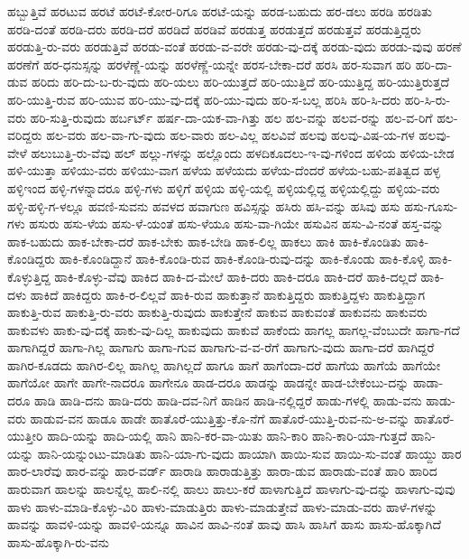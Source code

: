 {ಹಬ್ಬುತ್ತಿವೆ
ಹರಟುವ
ಹರಟೆ
ಹರಟೆ-ಕೋರ-ರಿಗೂ
ಹರಟೆ-ಯನ್ನು
ಹರಡ-ಬಹುದು
ಹರ-ಡಲು
ಹರಡಿ
ಹರಡಿತು
ಹರಡಿ-ದಂತೆ
ಹರಡಿ-ದರು
ಹರಡಿ-ದರೆ
ಹರಡಿದೆ
ಹರಡಿವೆ
ಹರಡುತ್ತ
ಹರಡುತ್ತದೆ
ಹರಡುತ್ತವೆ
ಹರಡುತ್ತಿದ್ದರು
ಹರಡುತ್ತಿ-ರು-ವರು
ಹರಡುತ್ತಿವೆ
ಹರಡು-ವಂತೆ
ಹರಡು-ವ-ವರೇ
ಹರಡು-ವು-ದಕ್ಕೆ
ಹರಡು-ವುದು
ಹರಡು-ವುವು
ಹರಣೆ
ಹರಣೆಗೆ
ಹರ-ಧನುಸ್ಸನ್ನು
ಹರಳೆಣ್ಣೆ-ಯನ್ನು
ಹರಳೆಣ್ಣೆ-ಯನ್ನೇ
ಹರಸ-ಬೇಕಾ-ದರೆ
ಹರಸಿ
ಹರ-ಸುವಾಗ
ಹರಿ
ಹರಿ-ದಾ-ಡುವ
ಹರಿದು
ಹರಿ-ದು-ಬ-ರು-ವುದು
ಹರಿ-ಯಲು
ಹರಿ-ಯುತ್ತದೆ
ಹರಿ-ಯುತ್ತಿದೆ
ಹರಿ-ಯುತ್ತಿದ್ದ
ಹರಿ-ಯುತ್ತಿರುತ್ತದೆ
ಹರಿ-ಯುತ್ತಿ-ರುವ
ಹರಿ-ಯುವ
ಹರಿ-ಯು-ವು-ದಕ್ಕೆ
ಹರಿ-ಯು-ವುದು
ಹರಿ-ಸ-ಬಲ್ಲ
ಹರಿಸಿ
ಹರಿ-ಸಿ-ದರು
ಹರಿ-ಸಿ-ರು-ವರು
ಹರಿ-ಸುತ್ತಿ-ರುವುದು
ಹರ್ಬರ್ಟ್
ಹರ್ಷ-ದಾ-ಯಕ-ವಾ-ಗಿತ್ತು
ಹಲ
ಹಲ-ವನ್ನು
ಹಲವ-ರನ್ನು
ಹಲ-ವ-ರಿಗೆ
ಹಲ-ವರಿದ್ದರು
ಹಲ-ವರು
ಹಲ-ವಾ-ಗು-ವುದು
ಹಲ-ವಾರು
ಹಲ-ವಿಲ್ಲ
ಹಲವಿವೆ
ಹಲವು
ಹಲವು-ವಿಷ-ಯ-ಗಳ
ಹಲವು-ವೇಳೆ
ಹಲುಬುತ್ತಿ-ರು-ವೆವು
ಹಲ್
ಹಲ್ಲು-ಗಳನ್ನು
ಹಲ್ಲೊಂದು
ಹಳದಿಕೂದಲು-ಇ-ವು-ಗಳಿಂದ
ಹಳಿಯ
ಹಳಿಯ-ಬೇಡ
ಹಳಿ-ಯುತ್ತಾ
ಹಳಿಯು-ವರು
ಹಳಿಯು-ವಾಗ
ಹಳೆಯ
ಹಳೆಯದು
ಹಳೆಯ-ದೆಂದರೆ
ಹಳೆಯ-ಬಹು-ಪತಿತ್ವದ
ಹಳ್ಳ
ಹಳ್ಳಿಇಂದ
ಹಳ್ಳಿ-ಗಳನ್ನಾದರೂ
ಹಳ್ಳಿ-ಗಳು
ಹಳ್ಳಿಗೆ
ಹಳ್ಳಿಯ
ಹಳ್ಳಿ-ಯಲ್ಲಿ
ಹಳ್ಳಿಯಲ್ಲಿದ್ದ
ಹಳ್ಳಿಯಲ್ಲಿದ್ದು
ಹಳ್ಳಿಯ-ವರು
ಹಳ್ಳಿ-ಹಳ್ಳಿ-ಗ-ಳಲ್ಲೂ
ಹವಣಿ-ಸುವನು
ಹವಳದ
ಹವಾಗುಣ
ಹವಿಸ್ಸನ್ನು
ಹಸಿರು
ಹಸಿ-ವನ್ನು
ಹಸಿವು
ಹಸು
ಹಸು-ಗೂಸು-ಗಳು
ಹಸುರು
ಹಸು-ಳೆಯ
ಹಸು-ಳೆ-ಯಂತೆ
ಹಸು-ಳೆಯೂ
ಹಸು-ವಾ-ಗಿಯೇ
ಹಸುವಿನ
ಹಸು-ವಿ-ನಂತೆ
ಹಸ್ತ-ವನ್ನು
ಹಾಕ-ಬಹುದು
ಹಾಕ-ಬೇಕಾ-ದರೆ
ಹಾಕ-ಬೇಕು
ಹಾಕ-ಬೇಡಿ
ಹಾಕ-ಲಿಲ್ಲ
ಹಾಕಲು
ಹಾಕಿ
ಹಾಕಿ-ಕೊಂಡಿತು
ಹಾಕಿ-ಕೊಂಡಿದ್ದರು
ಹಾಕಿ-ಕೊಂಡಿದ್ದಾನೆ
ಹಾಕಿ-ಕೊಂಡಿ-ರುವ
ಹಾಕಿ-ಕೊಂಡಿ-ರುವು-ದನ್ನು
ಹಾಕಿ-ಕೊಂಡು
ಹಾಕಿ-ಕೊಳ್ಳಿ
ಹಾಕಿ-ಕೊಳ್ಳುತ್ತಿದ್ದ
ಹಾಕಿ-ಕೊಳ್ಳು-ವೆವು
ಹಾಕಿದ
ಹಾಕಿ-ದ-ಮೇಲೆ
ಹಾಕಿ-ದರು
ಹಾಕಿ-ದರೂ
ಹಾಕಿ-ದರೆ
ಹಾಕಿ-ದಲ್ಲದೆ
ಹಾಕಿ-ದಳು
ಹಾಕಿದೆ
ಹಾಕಿದ್ದರು
ಹಾಕಿ-ರ-ಲಿಲ್ಲವೆ
ಹಾಕಿ-ರುವ
ಹಾಕುತ್ತಾನೆ
ಹಾಕುತ್ತಿದ್ದರು
ಹಾಕುತ್ತಿದ್ದಳು
ಹಾಕುತ್ತಿದ್ದಾಗ
ಹಾಕುತ್ತಿ-ರುವ
ಹಾಕುತ್ತಿ-ರು-ವರು
ಹಾಕುತ್ತಿ-ರುವುದು
ಹಾಕುತ್ತೇನೆ
ಹಾಕುವ
ಹಾಕುವಂತೆ
ಹಾಕುವನು
ಹಾಕುವರು
ಹಾಕುವಳು
ಹಾಕು-ವು-ದಕ್ಕೆ
ಹಾಕು-ವು-ದಿಲ್ಲ
ಹಾಕುವುದು
ಹಾಕುವೆ
ಹಾಕೆಂದು
ಹಾಗಲ್ಲ
ಹಾಗಲ್ಲ-ವೆಂಬುದೇ
ಹಾಗಾ-ಗದೆ
ಹಾಗಾಗಿದ್ದರೆ
ಹಾಗಾ-ಗಿಲ್ಲ
ಹಾಗಾಗು
ಹಾಗಾ-ಗುವ
ಹಾಗಾಗು-ವ-ವ-ರೆಗೆ
ಹಾಗಾಗು-ವುದು
ಹಾಗಾ-ದರೆ
ಹಾಗಿದ್ದರೆ
ಹಾಗಿರ-ಕೂಡದು
ಹಾಗಿರ-ಲಿಲ್ಲ
ಹಾಗಿಲ್ಲ
ಹಾಗಿಲ್ಲದೆ
ಹಾಗೂ
ಹಾಗೆ
ಹಾಗೆಂದಾ-ದರೆ
ಹಾಗೆಯ
ಹಾಗೆಯೆ
ಹಾಗೆಯೇ
ಹಾಗೆಯೋ
ಹಾಗೇ
ಹಾಗೇ-ನಾದರೂ
ಹಾಗೇನೂ
ಹಾಡ-ದರೂ
ಹಾಡನ್ನು
ಹಾಡನ್ನೇ
ಹಾಡ-ಬೇಕೆಂಬು-ದನ್ನು
ಹಾಡಾ-ದರೂ
ಹಾಡಿ
ಹಾಡಿ-ದನು
ಹಾಡಿ-ದರು
ಹಾಡಿ-ದವ-ನಿಗೆ
ಹಾಡಿನ
ಹಾಡಿ-ನಲ್ಲಿದ್ದರೆ
ಹಾಡು-ಗಳಲ್ಲಿ
ಹಾಡು-ವನು
ಹಾಡು-ವರು
ಹಾಡುವ-ವನ
ಹಾಡೂ
ಹಾಡೇ
ಹಾತೊರೆ-ಯುತ್ತಿತ್ತು-ಕೊ-ನೆಗೆ
ಹಾತೊರೆ-ಯುತ್ತಿ-ರುವ-ನು-ಅ-ವನ್ನು
ಹಾತೊರೆ-ಯುತ್ತೀರಿ
ಹಾದಿ-ಯನ್ನು
ಹಾದಿ-ಯಲ್ಲಿ
ಹಾನಿ
ಹಾನಿ-ಕರ-ವಾ-ಯಿತು
ಹಾನಿ-ಕಾರಿ
ಹಾನಿ-ಕಾರಿ-ಯಾ-ಗುತ್ತದೆ
ಹಾನಿ-ಯನ್ನು
ಹಾನಿ-ಯನ್ನುಂಟು-ಮಾಡಿತು
ಹಾನಿ-ಯಾ-ಗು-ವುದು
ಹಾಯಾಗಿ
ಹಾಯಿ-ಸುವ
ಹಾಯಿ-ಸು-ವಂತೆ
ಹಾಯ್ದು
ಹಾರ
ಹಾರ-ಲಾರೆವು
ಹಾರ-ವನ್ನು
ಹಾರ-ವರ್ಡ್
ಹಾರಾಡಿ
ಹಾರಾಡುತ್ತಿತ್ತು
ಹಾರಾ-ಡುವ
ಹಾರಾಡು-ವಂತೆ
ಹಾರಿ
ಹಾರಿದ
ಹಾರುವಾಗ
ಹಾಲನ್ನು
ಹಾಲನ್ನೆಲ್ಲ
ಹಾಲಿ-ನಲ್ಲಿ
ಹಾಲು
ಹಾಲು-ಕರೆ
ಹಾಳಾಗುತ್ತಿದೆ
ಹಾಳಾಗು-ವು-ದನ್ನು
ಹಾಳಾಗು-ವುವು
ಹಾಳು
ಹಾಳು-ಮಾಡಿ-ಕೊಳ್ಳು-ವಿರಿ
ಹಾಳು-ಮಾಡುತ್ತಿರು
ಹಾಳು-ಮಾಡುತ್ತೇವೆ
ಹಾಳು-ಮಾಡು-ವರು
ಹಾಳೆ-ಗಳನ್ನು
ಹಾವನ್ನು
ಹಾವಳಿ-ಯನ್ನು
ಹಾವಳಿ-ಯನ್ನೂ
ಹಾವಿನ
ಹಾವಿ-ನಂತೆ
ಹಾವು
ಹಾಸಿ
ಹಾಸಿಗೆ
ಹಾಸು
ಹಾಸು-ಹೊಕ್ಕಾಗಿದೆ
ಹಾಸು-ಹೊಕ್ಕಾಗಿ-ರು-ವನು
}
